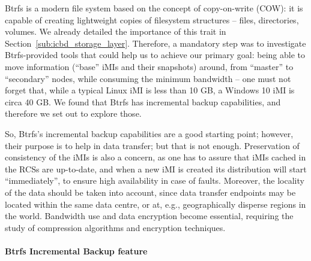 Btrfs is a modern file system based on the concept of copy-on-write (COW): it is capable of creating lightweight copies of filesystem structures – files, directories, volumes. We already detailed the importance of this trait in Section~\ref{sub:icbd_storage_layer}. Therefore, a mandatory step was to investigate Btrfs-provided tools that could help us to achieve our primary goal: being able to move information (“base” iMIs and their snapshots) around, from “master” to “secondary” nodes, while consuming the minimum bandwidth – one must not forget that, while a typical Linux iMI is less than 10 GB, a Windows 10 iMI is circa 40 GB. We found that Btrfs has incremental backup capabilities, and therefore we set out to explore those.
 
So,  Btrfs’s incremental backup capabilities are a good starting point; however, their purpose is to help in data transfer; but that is not enough. Preservation of consistency of the iMIs is also a concern, as one has to assure that iMIs cached in the RCSs are up-to-date, and when a new iMI is created its distribution will start “immediately”, to ensure high availability in case of faults. Moreover, the locality of the data should be taken into account, since data transfer endpoints may be located within the same data centre, or at, e.g., geographically disperse regions in the world. Bandwidth use and data encryption become essential, requiring the study of compression algorithms and encryption techniques.


\paragraph{Btrfs Incremental Backup feature}
\label{par:impl_incremental_btrfs}



